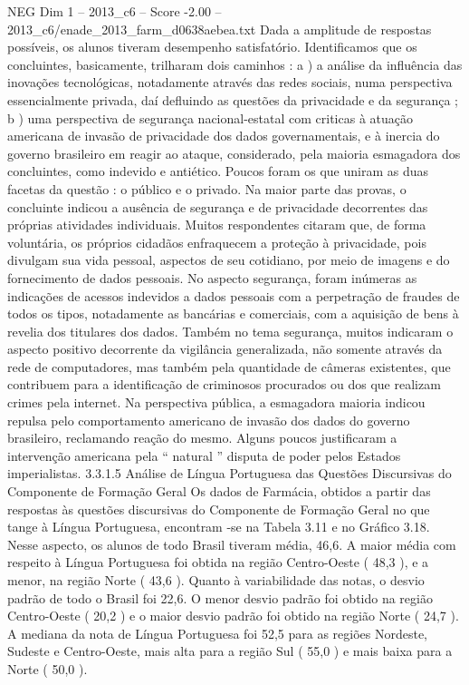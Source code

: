 \begin{textsample}{NEG Dim 1 – 2013\_c6 – Score -2.00 – 2013\_c6/enade\_2013\_farm\_d0638aebea.txt}
Dada a amplitude de respostas possíveis, os alunos tiveram desempenho satisfatório.
Identificamos que os concluintes, basicamente, trilharam dois caminhos : a ) a análise da influência das inovações tecnológicas, notadamente através das redes sociais, numa perspectiva essencialmente privada, daí defluindo as questões da privacidade e da segurança ; b ) uma perspectiva de segurança nacional-estatal com criticas à atuação americana de invasão de privacidade dos dados governamentais, e à inercia do governo brasileiro em reagir ao ataque, considerado, pela maioria esmagadora dos concluintes, como indevido e antiético.
Poucos foram os que uniram as duas facetas da questão : o público e o privado.
Na maior parte das provas, o concluinte indicou a ausência de segurança e de privacidade decorrentes das próprias atividades individuais.
Muitos respondentes citaram que, de forma voluntária, os próprios cidadãos enfraquecem a proteção à privacidade, pois divulgam sua vida pessoal, aspectos de seu cotidiano, por meio de imagens e do fornecimento de dados pessoais.
No aspecto segurança, foram inúmeras as indicações de acessos indevidos a dados pessoais com a perpetração de fraudes de todos os tipos, notadamente as bancárias e comerciais, com a aquisição de bens à revelia dos titulares dos dados.
Também no tema segurança, muitos indicaram o aspecto positivo decorrente da vigilância generalizada, não somente através da rede de computadores, mas também pela quantidade de câmeras existentes, que contribuem para a identificação de criminosos procurados ou dos que realizam crimes pela internet.
Na perspectiva pública, a esmagadora maioria indicou repulsa pelo comportamento americano de invasão dos dados do governo brasileiro, reclamando reação do mesmo.
Alguns poucos justificaram a intervenção americana pela “ natural ” disputa de poder pelos Estados imperialistas. 3.3.1.5 Análise de Língua Portuguesa das Questões Discursivas do Componente de Formação Geral Os dados de Farmácia, obtidos a partir das respostas às questões discursivas do Componente de Formação Geral no que tange à Língua Portuguesa, encontram -se na Tabela 3.11 e no Gráfico 3.18.
Nesse aspecto, os alunos de todo Brasil tiveram média, 46,6.
A maior média com respeito à Língua Portuguesa foi obtida na região Centro-Oeste ( 48,3 ), e a menor, na região Norte ( 43,6 ).
Quanto à variabilidade das notas, o desvio padrão de todo o Brasil foi 22,6.
O menor desvio padrão foi obtido na região Centro-Oeste ( 20,2 ) e o maior desvio padrão foi obtido na região Norte ( 24,7 ).
A mediana da nota de Língua Portuguesa foi 52,5 para as regiões Nordeste, Sudeste e Centro-Oeste, mais alta para a região Sul ( 55,0 ) e mais baixa para a Norte ( 50,0 ).

\end{textsample}
